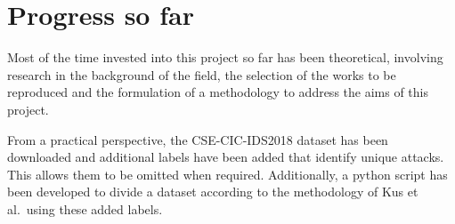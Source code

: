 \chapter{Progress so far}%
\label{chp:progress}

Most of the time invested into this project so far has been theoretical,
involving research in the background of the field, the selection of the works
to be reproduced and the formulation of a methodology to address the aims of
this project.

From a practical perspective, the CSE-CIC-IDS2018 dataset has been downloaded
and additional labels have been added that identify unique attacks. This allows
them to be omitted when required. Additionally, a python script has been
developed to divide a dataset according to the methodology of Kus et al.\ using
these added labels.